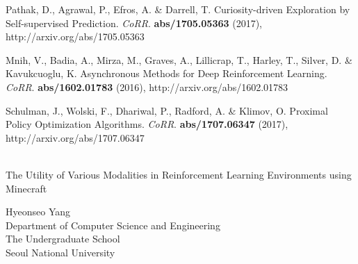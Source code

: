\documentclass[oneside, under, ko]{snuthesis}
\begin{document}
\begin{thebibliography}{00}
    Pathak, D., Agrawal, P., Efros, A. \& Darrell, T. Curiosity-driven Exploration by Self-supervised Prediction. {\em CoRR}. \textbf{abs/1705.05363} (2017), http://arxiv.org/abs/1705.05363


    Mnih, V., Badia, A., Mirza, M., Graves, A., Lillicrap, T., Harley, T., Silver, D. \& Kavukcuoglu, K. Asynchronous Methods for Deep Reinforcement Learning. {\em CoRR}. \textbf{abs/1602.01783} (2016), http://arxiv.org/abs/1602.01783

    Schulman, J., Wolski, F., Dhariwal, P., Radford, A. \& Klimov, O. Proximal Policy Optimization Algorithms. {\em CoRR}. \textbf{abs/1707.06347} (2017), http://arxiv.org/abs/1707.06347


\end{thebibliography}



% 



\newpage
{}
\begin{center}
    \fontsize{16}{32}\selectfont
    \abstractnamealt\\
    \fontsize{22}{36}\selectfont
    The Utility of Various Modalities in Reinforcement Learning Environments using Minecraft 
    \vspace{1cm}
    \fontsize{14}{21}\selectfont
    \begin{flushright}
        Hyeonseo Yang\\
        Department of Computer Science and Engineering\\
        The Undergraduate School \\ 
        Seoul National University \\ 
    \end{flushright}
		
\end{center}
\end{document}
